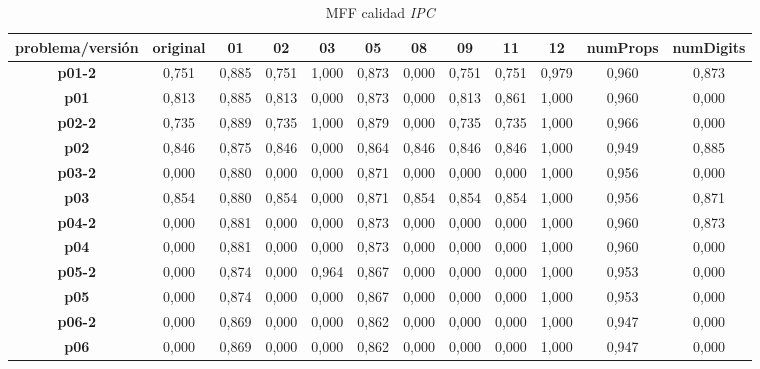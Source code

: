 \documentclass{article}
\begin{document}
    \begin{landscape}
    \begin{table}[]
    \centering
    \caption{MFF calidad \textit{IPC}}
    \label{my-label}
    \begin{tabular}{|c|c|c|c|c|c|c|c|c|c|c|c|}
    \hline
    \textbf{problema/versión} & \textbf{original} & \textbf{01}    & \textbf{02}    & \textbf{03}    & \textbf{05}    & \textbf{08} & \textbf{09}    & \textbf{11}    & \textbf{12}    & \textbf{numProps} & \textbf{numDigits} \\ \hline
    \textbf{p01-2}  &  0,751  &  0,885  &  0,751  &  1,000  &  0,873  &  0,000  &  0,751  &  0,751  &  0,979  &  0,960  &  0,873 \\ \hline
    \textbf{p01}    &  0,813  &  0,885  &  0,813  &  0,000  &  0,873  &  0,000  &  0,813  &  0,861  &  1,000  &  0,960  &  0,000 \\ \hline
    \textbf{p02-2}  &  0,735  &  0,889  &  0,735  &  1,000  &  0,879  &  0,000  &  0,735  &  0,735  &  1,000  &  0,966  &  0,000 \\ \hline
    \textbf{p02}    &  0,846  &  0,875  &  0,846  &  0,000  &  0,864  &  0,846  &  0,846  &  0,846  &  1,000  &  0,949  &  0,885 \\ \hline
    \textbf{p03-2}  &  0,000  &  0,880  &  0,000  &  0,000  &  0,871  &  0,000  &  0,000  &  0,000  &  1,000  &  0,956  &  0,000 \\ \hline
    \textbf{p03}    &  0,854  &  0,880  &  0,854  &  0,000  &  0,871  &  0,854  &  0,854  &  0,854  &  1,000  &  0,956  &  0,871 \\ \hline
    \textbf{p04-2}  &  0,000  &  0,881  &  0,000  &  0,000  &  0,873  &  0,000  &  0,000  &  0,000  &  1,000  &  0,960  &  0,873 \\ \hline
    \textbf{p04}    &  0,000  &  0,881  &  0,000  &  0,000  &  0,873  &  0,000  &  0,000  &  0,000  &  1,000  &  0,960  &  0,000 \\ \hline
    \textbf{p05-2}  &  0,000  &  0,874  &  0,000  &  0,964  &  0,867  &  0,000  &  0,000  &  0,000  &  1,000  &  0,953  &  0,000 \\ \hline
    \textbf{p05}    &  0,000  &  0,874  &  0,000  &  0,000  &  0,867  &  0,000  &  0,000  &  0,000  &  1,000  &  0,953  &  0,000 \\ \hline
    \textbf{p06-2}  &  0,000  &  0,869  &  0,000  &  0,000  &  0,862  &  0,000  &  0,000  &  0,000  &  1,000  &  0,947  &  0,000 \\ \hline
    \textbf{p06}    &  0,000  &  0,869  &  0,000  &  0,000  &  0,862  &  0,000  &  0,000  &  0,000  &  1,000  &  0,947  &  0,000 \\ \hline

\end{tabular}
\end{table}
\end{landscape}
\end{document}
